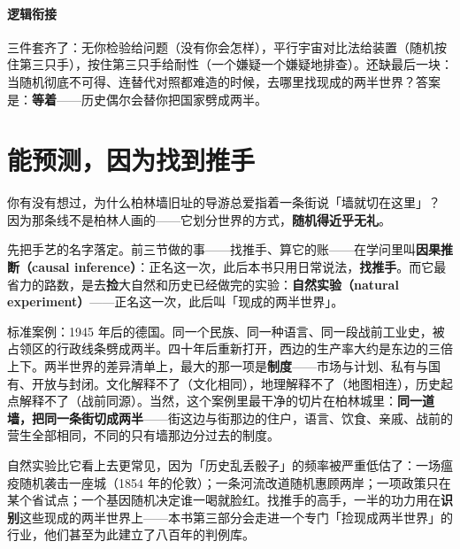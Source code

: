\documentclass[../../main2.tex]{subfiles}
\begin{document}
	\paragraph*{逻辑衔接}
	三件套齐了：无你检验给问题（没有你会怎样），平行宇宙对比法给装置（随机按住第三只手），按住第三只手给耐性（一个嫌疑一个嫌疑地排查）。还缺最后一块：当随机彻底不可得、连替代对照都难造的时候，去哪里找现成的两半世界？答案是：\textbf{等着}——历史偶尔会替你把国家劈成两半。

	\section{能预测，因为找到推手}
	\label{sec:contrib-inference}

	\begin{readingnote}
		你有没有想过，为什么柏林墙旧址的导游总爱指着一条街说「墙就切在这里」？\\
		因为那条线不是柏林人画的——它划分世界的方式，\textbf{随机得近乎无礼}。
	\end{readingnote}

	先把手艺的名字落定。前三节做的事——找推手、算它的账——在学问里叫\textbf{因果推断（causal inference）}：正名这一次，此后本书只用日常说法，\textbf{找推手}。而它最省力的路数，是去\textbf{捡}大自然和历史已经做完的实验：\textbf{自然实验（natural experiment）}——正名这一次，此后叫「现成的两半世界」。

	标准案例：1945 年后的德国。同一个民族、同一种语言、同一段战前工业史，被占领区的行政线条劈成两半。四十年后重新打开，西边的生产率大约是东边的三倍上下。两半世界的差异清单上，最大的那一项是\textbf{制度}——市场与计划、私有与国有、开放与封闭。文化解释不了（文化相同），地理解释不了（地图相连），历史起点解释不了（战前同源）。当然，这个案例里最干净的切片在柏林城里：\textbf{同一道墙，把同一条街切成两半}——街这边与街那边的住户，语言、饮食、亲戚、战前的营生全部相同，不同的只有墙那边分过去的制度。

	自然实验比它看上去更常见，因为「历史乱丢骰子」的频率被严重低估了：一场瘟疫随机袭击一座城（1854 年的伦敦）；一条河流改道随机惠顾两岸；一项政策只在某个省试点；一个基因随机决定谁一喝就脸红。找推手的高手，一半的功力用在\textbf{识别}这些现成的两半世界上——本书第三部分会走进一个专门「捡现成两半世界」的行业，他们甚至为此建立了八百年的判例库。
\end{document}
